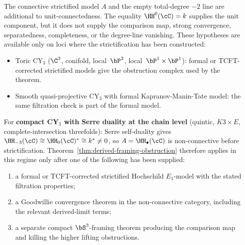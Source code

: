 \begin{remark}
\label{rem:derived-framing-scope-restriction}
The connective strictified model $A$ and the empty total-degree $-2$
line are additional to unit-connectedness. The equality
$\HH^0(\cC)=k$ supplies the unit component, but it does not supply the
comparison map, strong convergence, separatedness, completeness, or the
degree-line vanishing. These hypotheses are available only on loci where
the strictification has been constructed:
\begin{itemize}
 \item Toric CY$_3$ \textup{($\C^3$, conifold, local~$\bP^2$, local~$\bP^1 \times \bP^1$):}
 formal or TCFT-corrected strictified models give the obstruction
 complex used by the theorem.
 \item Smooth quasi-projective CY$_3$ with formal Kapranov-Manin-Tate model:
 the same filtration check is part of the formal model.
\end{itemize}
For \textbf{compact CY$_3$ with Serre duality at the chain level}
\textup{(}quintic, $K3 \times E$, complete-intersection threefolds\textup{):}
Serre self-duality gives
$\HH_{-3}(\cC) \cong \HH_0(\cC)^* \cong k^* \neq 0$, so $A = \HH_\bullet(\cC)$
is non-connective before strictification. Theorem~\ref{thm:derived-framing-obstruction}
therefore applies in this regime only after one of the following has
been supplied:
\begin{enumerate}[label=\textup{(\arabic*)}]
 \item a formal or TCFT-corrected strictified Hochschild $E_1$-model with
 the stated filtration properties;
 \item a Goodwillie convergence theorem in the non-connective category,
 including the relevant derived-limit terms;
 \item a separate compact $\bS^3$-framing theorem producing the comparison
 map and killing the higher lifting obstructions.
\end{enumerate}
\end{remark}

